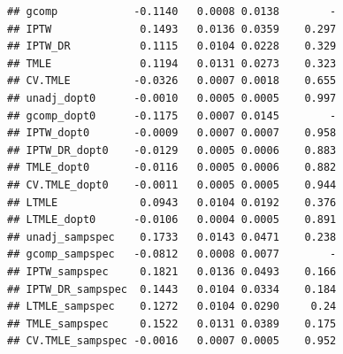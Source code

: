 \documentclass[11pt]{article}\usepackage[]{graphicx}\usepackage[]{color}
\makeatletter
\newenvironment{kframe}{%
 \def\at@end@of@kframe{}%
 \ifinner\ifhmode%
  \def\at@end@of@kframe{\end{minipage}}%
  \begin{minipage}{\columnwidth}%
 \fi\fi%
 \def\FrameCommand##1{\hskip\@totalleftmargin \hskip-\fboxsep
 \colorbox{shadecolor}{##1}\hskip-\fboxsep
     \hskip-\linewidth \hskip-\@totalleftmargin \hskip\columnwidth}%
 \MakeFramed {\advance\hsize-\width
   \@totalleftmargin\z@ \linewidth\hsize
   \@setminipage}}%
 {\par\unskip\endMakeFramed%
 \at@end@of@kframe}
\newenvironment{knitrout}{}{} %
\makeatother
\begin{document}
\begin{knitrout}
\begin{kframe}
\begin{verbatim}
## gcomp            -0.1140   0.0008 0.0138        -
## IPTW              0.1493   0.0136 0.0359    0.297
## IPTW_DR           0.1115   0.0104 0.0228    0.329
## TMLE              0.1194   0.0131 0.0273    0.323
## CV.TMLE          -0.0326   0.0007 0.0018    0.655
## unadj_dopt0      -0.0010   0.0005 0.0005    0.997
## gcomp_dopt0      -0.1175   0.0007 0.0145        -
## IPTW_dopt0       -0.0009   0.0007 0.0007    0.958
## IPTW_DR_dopt0    -0.0129   0.0005 0.0006    0.883
## TMLE_dopt0       -0.0116   0.0005 0.0006    0.882
## CV.TMLE_dopt0    -0.0011   0.0005 0.0005    0.944
## LTMLE             0.0943   0.0104 0.0192    0.376
## LTMLE_dopt0      -0.0106   0.0004 0.0005    0.891
## unadj_sampspec    0.1733   0.0143 0.0471    0.238
## gcomp_sampspec   -0.0812   0.0008 0.0077        -
## IPTW_sampspec     0.1821   0.0136 0.0493    0.166
## IPTW_DR_sampspec  0.1443   0.0104 0.0334    0.184
## LTMLE_sampspec    0.1272   0.0104 0.0290     0.24
## TMLE_sampspec     0.1522   0.0131 0.0389    0.175
## CV.TMLE_sampspec -0.0016   0.0007 0.0005    0.952
\end{verbatim}
\end{kframe}
\end{knitrout}
\end{document}
